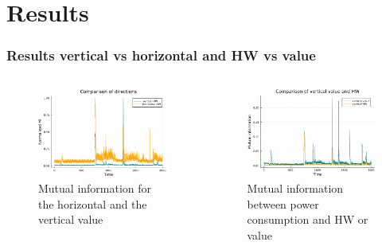 \documentclass{beamer}
\begin{document}
	\section{Results}
	\begin{frame}
		\frametitle{Results vertical vs horizontal and HW vs value}
		\begin{columns}[T]
			\begin{figure}[h]
				\centering
				\includegraphics[scale=0.25]{img_files/h_and_v_one_byte}
				\caption{Mutual information for the horizontal and the vertical value}
				\label{hvval}
			\end{figure}
			\begin{figure}
				\centering
				\includegraphics[scale=0.25]{img_files/vertical_one_bit}
				\caption{Mutual information between power consumption and HW or value}
				\label{vHW}
			\end{figure}
		\end{columns}
	\end{frame}
	
\end{document}
